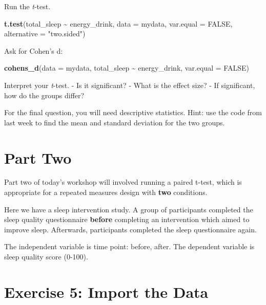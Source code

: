 \documentclass[
]{book}
\newenvironment{Shaded}{\begin{snugshade}}{\end{snugshade}}
\newcommand{\AttributeTok}[1]{\textcolor[rgb]{0.13,0.29,0.53}{#1}}
\newcommand{\ConstantTok}[1]{\textcolor[rgb]{0.56,0.35,0.01}{#1}}
\newcommand{\FunctionTok}[1]{\textcolor[rgb]{0.13,0.29,0.53}{\textbf{#1}}}
\newcommand{\NormalTok}[1]{#1}
\newcommand{\SpecialCharTok}[1]{\textcolor[rgb]{0.81,0.36,0.00}{\textbf{#1}}}
\newcommand{\StringTok}[1]{\textcolor[rgb]{0.31,0.60,0.02}{#1}}
\let\oldsection\section
\renewcommand{\section}{\needspace{5\baselineskip}\oldsection}
\begin{document}
Run the \emph{t}-test.

\begin{Shaded}
\begin{Highlighting}[]
\FunctionTok{t.test}\NormalTok{(total\_sleep }\SpecialCharTok{\textasciitilde{}}\NormalTok{ energy\_drink, }\AttributeTok{data =}\NormalTok{ mydata, }\AttributeTok{var.equal =} \ConstantTok{FALSE}\NormalTok{, }\AttributeTok{alternative =} \StringTok{"two.sided"}\NormalTok{)}
\end{Highlighting}
\end{Shaded}

Ask for Cohen's d:

\begin{Shaded}
\begin{Highlighting}[]
\FunctionTok{cohens\_d}\NormalTok{(}\AttributeTok{data =}\NormalTok{ mydata, total\_sleep }\SpecialCharTok{\textasciitilde{}}\NormalTok{ energy\_drink, }\AttributeTok{var.equal =} \ConstantTok{FALSE}\NormalTok{)}
\end{Highlighting}
\end{Shaded}

Interpret your \emph{t}-test. - Is it significant? - What is the effect size? - If significant, how do the groups differ?

For the final question, you will need descriptive statistics. Hint: use the code from last week to find the mean and standard deviation for the two groups.

\section{Part Two}\label{part-two}

Part two of today's workshop will involved running a paired t-test, which is appropriate for a repeated measures design with \textbf{two} conditions.

Here we have a sleep intervention study. A group of participants completed the sleep quality questionnaire \textbf{before} completing an intervention which aimed to improve sleep. Afterwards, participants completed the sleep questionnaire again.

The independent variable is time point: before, after. The dependent variable is sleep quality score (0-100).

\section{Exercise 5: Import the Data}\label{exercise-5-import-the-data}
\end{document}
